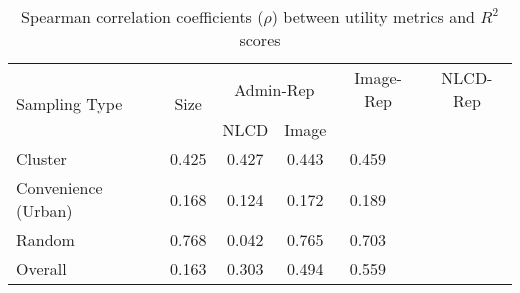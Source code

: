 \begin{table}[htbp]
\centering
\begin{tabular}{lcccc}
\toprule
\multirow{2}{*}{Sampling Type} & \multirow{2}{*}{Size} & \multicolumn{2}{c}{Admin-Rep} & \multicolumn{2}{c}{Image-Rep} & \multicolumn{2}{c}{NLCD-Rep}  \\
\cmidrule(lr){3-4}
 & & NLCD & Image & \\
\midrule
Cluster & 0.425 & 0.427 & 0.443 & 0.459 \\
Convenience (Urban) & 0.168 & 0.124 & 0.172 & 0.189 \\
Random & 0.768 & 0.042 & 0.765 & 0.703 \\
\midrule
Overall & 0.163 & 0.303 & 0.494 & 0.559 \\
\bottomrule
\end{tabular}
\caption{Spearman correlation coefficients ($\rho$) between utility metrics and $R^2$ scores}
\label{tab:rho_values}
\end{table}